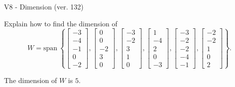 \begin{exercise}
  \begin{exerciseTitle}V8 - Dimension (ver. 132)\end{exerciseTitle}
  \begin{exerciseStatement}
    Explain how to find the dimension of 
\[W=\mathrm{span}\ \left\{\left[\begin{array}{r}
-3 \\
-4 \\
-1 \\
0 \\
-2
\end{array}\right] , \left[\begin{array}{r}
0 \\
0 \\
-2 \\
3 \\
0
\end{array}\right] , \left[\begin{array}{r}
-3 \\
-2 \\
3 \\
1 \\
0
\end{array}\right] , \left[\begin{array}{r}
1 \\
-4 \\
2 \\
0 \\
-3
\end{array}\right] , \left[\begin{array}{r}
-3 \\
-2 \\
-2 \\
-4 \\
-1
\end{array}\right] , \left[\begin{array}{r}
-2 \\
-2 \\
1 \\
0 \\
2
\end{array}\right]\right\}.\]



  \end{exerciseStatement}
  \begin{exerciseAnswer}
   The dimension of \(W\) is  \(5\).
  


  \end{exerciseAnswer}
\end{exercise}
